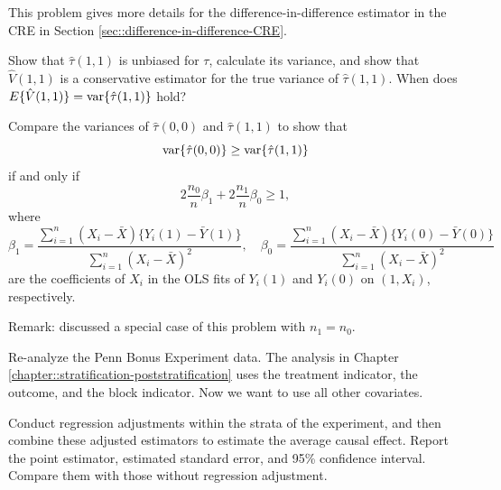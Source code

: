 \begin{HomeworkProblem}\label{exr:6-12}

This problem gives more details for the difference-in-difference estimator in the CRE in Section \ref{sec::difference-in-difference-CRE}.

Show that $\hat{\tau}(1,1) $ is unbiased for $\tau$, calculate its variance, and show that $\hat{V}( 1,1 ) $ is a conservative estimator for the true variance of $\hat{\tau}(1,1) $. When does $E\{\hat{V}( 1,1 ) \} = \var\{  \hat{\tau}(1,1)  \}$ hold?



Compare the variances of $\hat{\tau}(0,0) $ and $\hat{\tau}(1,1) $ to show that
\[
\var\{ \hat{\tau}(0,0) \}  \geq \var\{  \hat{\tau}(1,1)  \}
\]
if and only if
\[
2 \frac{n_0}{n} \beta_1 + 2\frac{n_1}{n} \beta_0 \geq 1,
\]
where
\[
\beta_1 = \frac{\sum_{i=1}^n (X_i-\bar{X})\{  Y_i(1)-\bar{Y}(1) \}  }{  \sum_{i=1}^n (X_i-\bar{X})^2 },\quad
\beta_0 = \frac{\sum_{i=1}^n (X_i-\bar{X})\{  Y_i(0)-\bar{Y}(0) \}  }{  \sum_{i=1}^n (X_i-\bar{X})^2 }
\]
are the coefficients of $X_i$ in the OLS fits of $Y_i(1)$ and $Y_i(0)$ on $(1,X_i)$, respectively.


Remark: \citet[][page 28]{gerber2012field} discussed a special case  of this problem with $n_1=n_0.$



\end{HomeworkProblem}

\begin{HomeworkProblem}\label{exr:6-13}


Re-analyze the Penn Bonus Experiment data. The analysis in Chapter \ref{chapter::stratification-poststratification} uses the treatment indicator, the outcome, and the block indicator. Now we want to use all other covariates.

Conduct regression adjustments within the strata of the experiment, and then combine these adjusted estimators to estimate the average causal effect. Report the point estimator, estimated standard error, and 95\% confidence interval. Compare them with those without regression adjustment.


\end{HomeworkProblem}

